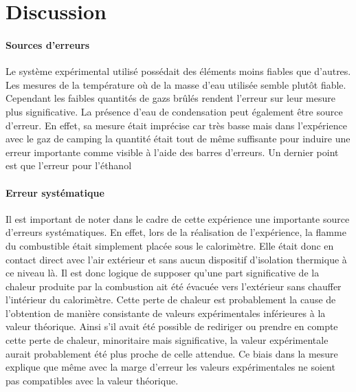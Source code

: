 \section{Discussion}



\paragraph*{Sources d'erreurs}
Le système expérimental utilisé possédait des éléments moins fiables que d'autres. Les mesures de la température où de la masse d'eau utilisée semble plutôt fiable. Cependant les faibles quantités de gazs brûlés rendent l'erreur sur leur mesure plus significative. La présence d'eau de condensation peut également être source d'erreur. En effet, sa mesure était imprécise car très basse mais dans l'expérience avec le gaz de camping la quantité était tout de même suffisante pour induire une erreur importante comme visible à l'aide des barres d'erreurs. Un dernier point est que l'erreur pour l'éthanol


\paragraph*{Erreur systématique}
Il est important de noter dans le cadre de cette expérience une importante source d'erreurs systématiques. En effet, lors de la réalisation de l'expérience, la flamme du combustible était simplement placée sous le calorimètre. Elle était donc en contact direct avec l'air extérieur et sans aucun dispositif d'isolation thermique à ce niveau là. Il est donc logique de supposer qu'une part significative de la chaleur produite par la combustion ait été évacuée vers l'extérieur sans chauffer l'intérieur du calorimètre. Cette perte de chaleur est probablement la cause de l'obtention de manière consistante de valeurs expérimentales inférieures à la valeur théorique. Ainsi s'il avait été possible de rediriger ou prendre en compte cette perte de chaleur, minoritaire mais significative, la valeur expérimentale aurait probablement été plus proche de celle attendue. Ce biais dans la mesure explique que même avec la marge d'erreur les valeurs expérimentales ne soient pas compatibles avec la valeur théorique.